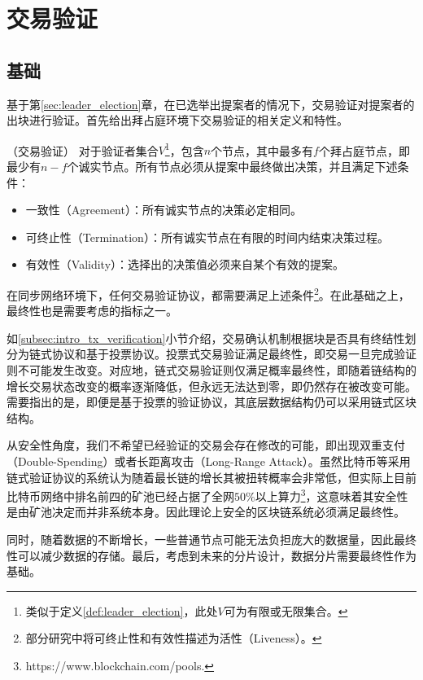 \section{交易验证}
\subsection{基础}
基于第\ref{sec:leader_election}章，在已选举出提案者的情况下，交易验证对提案者的出块进行验证。首先给出拜占庭环境下交易验证的相关定义和特性。

\begin{definition}
（交易验证） 对于验证者集合$V$\footnote{类似于定义\ref{def:leader_election}，此处$V$可为有限或无限集合。}，包含$n$个节点，其中最多有$f$个拜占庭节点，即最少有$n-f$个诚实节点。所有节点必须从提案中最终做出决策，并且满足下述条件：
\begin{itemize}
	\item 一致性（Agreement）：所有诚实节点的决策必定相同。
	\item 可终止性（Termination）：所有诚实节点在有限的时间内结束决策过程。
	\item 有效性（Validity）：选择出的决策值必须来自某个有效的提案。
\end{itemize}
\end{definition}

在同步网络环境下，任何交易验证协议，都需要满足上述条件\footnote{部分研究中将可终止性和有效性描述为活性（Liveness）。}。在此基础之上，最终性也是需要考虑的指标之一。

如\ref{subsec:intro_tx_verification}小节介绍，交易确认机制根据块是否具有终结性划分为链式协议和基于投票协议。投票式交易验证满足最终性，即交易一旦完成验证则不可能发生改变。对应地，链式交易验证则仅满足概率最终性，即随着链结构的增长交易状态改变的概率逐渐降低，但永远无法达到零，即仍然存在被改变可能。需要指出的是，即便是基于投票的验证协议，其底层数据结构仍可以采用链式区块结构。

从安全性角度，我们不希望已经验证的交易会存在修改的可能，即出现双重支付（Double-Spending）或者长距离攻击（Long-Range Attack）。虽然比特币等采用链式验证协议的系统认为随着最长链的增长其被扭转概率会非常低，但实际上目前比特币网络中排名前四的矿池已经占据了全网$50\%$以上算力\footnote{https://www.blockchain.com/pools.}，这意味着其安全性是由矿池决定而并非系统本身。因此理论上安全的区块链系统必须满足最终性。

同时，随着数据的不断增长，一些普通节点可能无法负担庞大的数据量，因此最终性可以减少数据的存储。最后，考虑到未来的分片设计，数据分片需要最终性作为基础。

